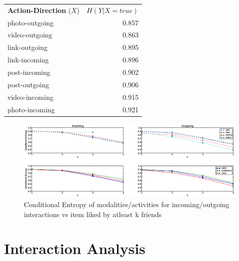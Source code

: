 \begin{table}
{\begin{tabular}{| >{\small}l | >{\small}r | }
\multicolumn{2}{c}{}\\
                \hline	
		\textbf{Action-Direction} ($X$) & $H(Y|X=true)$ \\
		\hline
		photo-outgoing & 0.857 \\
		video-outgoing & 0.863 \\
		link-outgoing & 0.895 \\
		link-incoming & 0.896 \\
		post-incoming & 0.902 \\
		post-outgoing & 0.906 \\
		video-incoming & 0.915 \\
		photo-incoming & 0.921 \\
		\hline
				
	\end{tabular}}
\end{table}

\begin{figure}[tbp!]
\hspace{-10mm}
\includegraphics[width=200mm]{data/plots/vsk/ModalityActionsvsKFriends.eps}
\caption{Conditional Entropy  of modalities/activities for incoming/outgoing interactions vs item liked by atleast k friends}
\label{Fig2}
\end{figure}

\section{Interaction Analysis}

